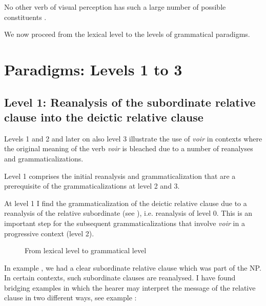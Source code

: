 \documentclass[output=paper]{langsci/langscibook}
\begin{document}
No other verb of visual perception has such a large number of possible constituents \citep[10]{WillemsDecfrancq2000}. 

We now proceed from the lexical level to the levels of grammatical paradigms.

\section{Paradigms: Levels 1 to 3} \label{kragh:4}
\subsection{Level 1: Reanalysis of the subordinate relative clause into the deictic relative clause} \label{kragh:4.1}

Levels 1 and 2 and later on also level 3 illustrate the use of \textit{voir} in contexts where the original meaning of the verb \textit{voir} is bleached due to a number of reanalyses and grammaticalizations.

Level 1 comprises the initial reanalysis and grammaticalization that are a prerequisite of the grammaticalizations at level 2 and 3.

At level 1 I find the grammaticalization of the deictic relative clause due to a reanalysis of the relative subordinate (see \citealt{KraghSchosler2014, KraghSchosler2015}), i.e. reanalysis of level 0. This is an important step for the subsequent grammaticalizations that involve \textit{voir} in a progressive context (level 2).

\begin{figure}
\caption{From lexical level to grammatical level\label{fig:kragh:2}}
\end{figure}

In example , we had a clear subordinate relative clause which was part of the NP. In certain contexts, such subordinate clauses are reanalysed. I have found bridging examples in which the hearer may interpret the message of the relative clause in two different ways, see example :
\end{document}
